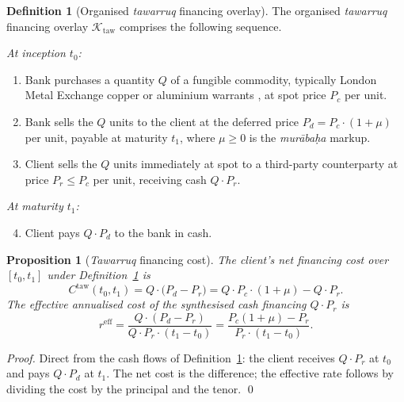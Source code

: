 \documentclass[preprint,12pt,authoryear]{elsarticle}
\newtheorem{proposition}{Proposition}[section]
\theoremstyle{definition}
\newtheorem{definition}{Definition}[section]
\begin{document}
\begin{definition}[Organised \emph{tawarruq} financing overlay]
\label{def:tawarruq}
The organised \emph{tawarruq} financing overlay
$\mathcal{K}_{\text{taw}}$ comprises the following sequence.

\emph{At inception $t_0$:}
\begin{enumerate}
    \item Bank purchases a quantity $Q$ of a fungible commodity,
    typically London Metal Exchange copper or aluminium warrants
   , at spot price $P_c$ per unit.
    \item Bank sells the $Q$ units to the client at the deferred
    price $P_d = P_c \cdot (1 + \mu)$ per unit, payable at maturity
    $t_1$, where $\mu \geq 0$ is the \emph{mur\={a}ba\d{h}a}
    markup.
    \item Client sells the $Q$ units immediately at spot to a
    third-party counterparty at price $P_r \leq P_c$ per unit,
    receiving cash $Q \cdot P_r$.
\end{enumerate}

\emph{At maturity $t_1$:}
\begin{enumerate}
    \setcounter{enumi}{3}
    \item Client pays $Q \cdot P_d$ to the bank in cash.
\end{enumerate}
\end{definition}

\begin{proposition}[\emph{Tawarruq} financing cost]
\label{prop:tawarruq-cost}
The client's net financing cost over $[t_0, t_1]$ under
Definition~\ref{def:tawarruq} is
\begin{equation}
    C^{\text{taw}}(t_0, t_1)
    = Q \cdot \bigl( P_d - P_r \bigr)
    = Q \cdot P_c \cdot (1 + \mu) - Q \cdot P_r.
    \label{eq:tawarruq-cost}
\end{equation}
The effective annualised cost of the synthesised cash financing
$Q \cdot P_r$ is
\begin{equation}
    r^{\text{eff}}
    = \frac{Q \cdot (P_d - P_r)}{Q \cdot P_r \cdot (t_1 - t_0)}
    = \frac{P_c (1 + \mu) - P_r}{P_r \cdot (t_1 - t_0)}.
    \label{eq:tawarruq-effective-rate}
\end{equation}
\end{proposition}

\begin{proof}
Direct from the cash flows of Definition~\ref{def:tawarruq}: the
client receives $Q \cdot P_r$ at $t_0$ and pays $Q \cdot P_d$ at
$t_1$. The net cost is the difference; the effective rate follows
by dividing the cost by the principal and the tenor. \qed
\end{proof}
\end{document}
